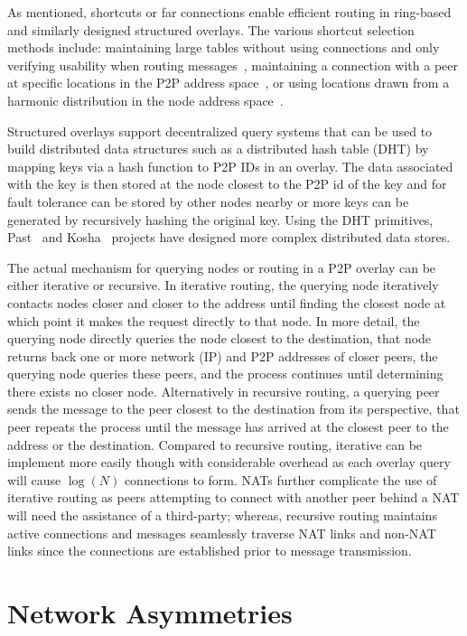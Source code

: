 As mentioned, shortcuts or far connections enable efficient routing in
ring-based and similarly designed structured overlays.  The various shortcut
selection methods include: maintaining large tables without using connections
and only verifying usability when routing messages~\cite{pastry, kademlia},
maintaining a connection with a peer at specific locations in the P2P address
space~\cite{chord}, or using locations drawn from a harmonic distribution in
the node address space~\cite{symphony}.

Structured overlays support decentralized query systems that can be used to
build distributed data structures such as a distributed hash table (DHT) by
mapping keys via a hash function to P2P IDs in an overlay.  The data associated
with the key is then stored at the node closest to the P2P id of the key and
for fault tolerance can be stored by other nodes nearby or more keys can be
generated by recursively hashing the original key.  Using the DHT primitives,
Past~\cite{past} and Kosha~\cite{kosha} projects have designed more complex
distributed data stores.

The actual mechanism for querying nodes or routing in a P2P overlay can be
either iterative or recursive.  In iterative routing, the querying node
iteratively contacts nodes closer and closer to the address until finding the
closest node at which point it makes the request directly to that node.  In
more detail, the querying node directly queries the node closest to the
destination, that node returns back one or more network (IP) and P2P addresses
of closer peers, the querying node queries these peers, and the process
continues until determining there exists no closer node.  Alternatively in
recursive routing, a querying peer sends the message to the peer closest to the
destination from its perspective, that peer repeats the process until the
message has arrived at the closest peer to the address or the destination.
Compared to recursive routing, iterative can be implement more easily though
with considerable overhead as each overlay query will cause $\log(N)$
connections to form.  NATs further complicate the use of iterative routing as
peers attempting to connect with another peer behind a NAT will need the
assistance of a third-party; whereas, recursive routing maintains active
connections and messages seamlessly traverse NAT links and non-NAT links since
the connections are established prior to message transmission.

\section{Network Asymmetries}

